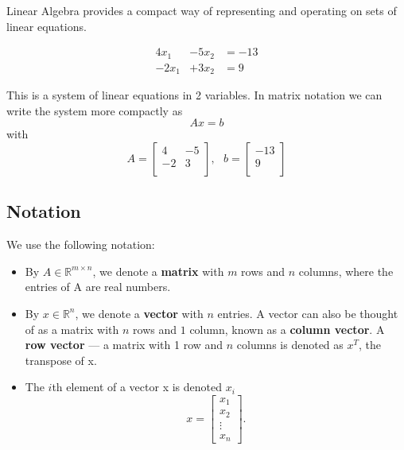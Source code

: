 
Linear Algebra provides a compact way of representing and operating on sets
of linear equations.

\begin{eqnarray*}
4x_{1} &- 5x_{2} &= -13 \\
-2x_{1} &+ 3x_{2} &= 9
\end{eqnarray*}

This is a system of linear equations in 2 variables. In matrix notation we can write
the system more compactly as 
\begin{equation*}
Ax=b
\end{equation*}
with
\begin{equation*}
A= \left[ \begin{array}{cc}
4 & -5 \\
-2 & 3 \\
\end{array} \right], \text{	} b= \left[ \begin{array}{c}
-13 \\
9 \\
\end{array}\right]
\end{equation*}

\subsection{Notation}

We use the following notation:

\begin{itemize}
\item By $A \in \mathbb{R}^{m \times n}$, we denote a {\bf matrix} with $m$ rows and $n$ columns, where the 
entries of A are real numbers.
\item By $x \in \mathbb{R}^{n}$, we denote a {\bf vector} with $n$ entries. A vector can also be 
thought of as a matrix with $n$ rows and $1$ column, known as a {\bf column vector}. A {\bf row vector}
--- a matrix with 1 row and $n$ columns is denoted as $x^{T}$, the transpose of x.
\item The $i$th element of a vector x is denoted $x_{i}$
\begin{equation*}
x = \left[\begin{array}{c}
x_{1} \\
x_{2} \\
\vdots \\
x_{n}
\end{array}\right].
\end{equation*}
\end{itemize}

